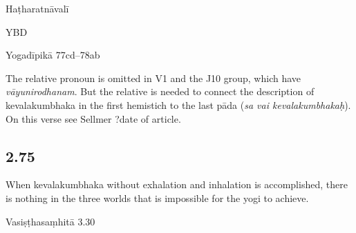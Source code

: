 \begin{ekdosis}
\begin{testimonia}[hp02_074]
Haṭharatnāvalī

\begin{versinnote}
\end{versinnote}

YBD

\begin{versinnote}
\end{versinnote}

Yogadīpikā 77cd--78ab

\begin{versinnote}
\end{versinnote}
\end{testimonia}

\begin{philcomm}[hp02_074]
The relative pronoun is omitted in V1 and the J10 group, which have \emph{vāyunirodhanam}. But the relative is needed to connect the description of kevalakumbhaka in the first hemistich to the last pāda (\emph{sa vai kevalakumbhakaḥ}).
On this verse see Sellmer ?date of article.
\end{philcomm}

\subsection*{2.75}
\begin{translation}[hp02_075]
When kevalakumbhaka without exhalation and inhalation is accomplished, there is nothing in the three worlds that is impossible for the yogi to achieve.
\end{translation}


\begin{sources}[hp02_075]
Vasiṣṭhasaṃhitā 3.30

\begin{versinnote}
\end{versinnote}


\end{sources}
\end{ekdosis}
